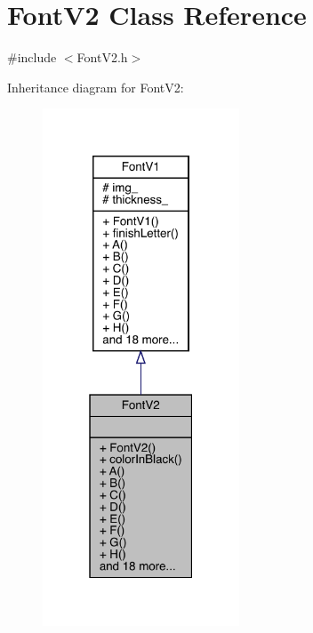 \hypertarget{class_font_v2}{}\section{Font\+V2 Class Reference}
\label{class_font_v2}


{\ttfamily \#include $<$Font\+V2.\+h$>$}



Inheritance diagram for Font\+V2\+:\nopagebreak
\begin{figure}[H]
\begin{center}
\leavevmode
\includegraphics[width=166pt]{class_font_v2__inherit__graph}
\end{center}
\end{figure}


